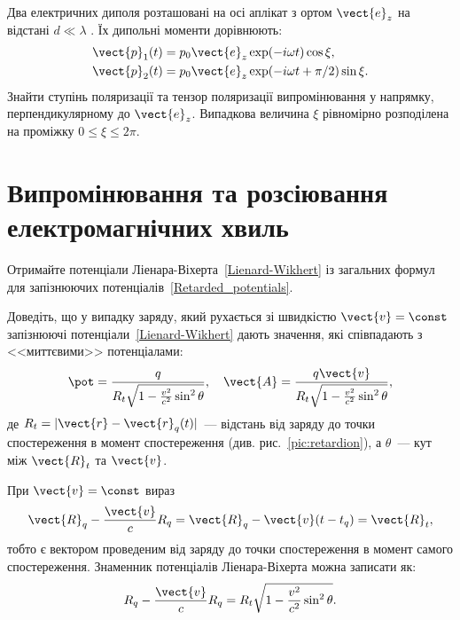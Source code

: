 \begin{problem}
Два електричних диполя розташовані на осі аплікат з ортом $\vect{e}_z$  на відстані $d \ll \lambda$ . Їх дипольні моменти дорівнюють:
\begin{align*}
	\vect{p}_1(t) & = p_0\vect{e}_z\exp(-i\omega t)\cos\xi,        \\
	\vect{p}_2(t) & = p_0\vect{e}_z\exp(-i\omega t +\pi/2)\sin\xi.
\end{align*}
Знайти ступінь поляризації та тензор поляризації випромінювання у напрямку, перпендикулярному до $\vect{e}_z$. Випадкова величина $\xi$ рівномірно розподілена на проміжку $0 \le \xi \le 2\pi$.
\end{problem}



\section{Випромінювання та розсіювання електромагнічних хвиль}


\begin{problem}
Отримайте потенціали Ліенара-Віхерта~\eqref{Lienard-Wikhert} із загальних формул для запізнюючих потенціалів~\eqref{Retarded_potentials}.
\end{problem}


\begin{problem}
Доведіть, що у випадку заряду, який рухається зі швидкістю $\vect{v} = \const$ запізнюючі потенціали~\eqref{Lienard-Wikhert} дають значення, які співпадають з <<миттєвими>> потенціалами:
\[
	\pot =  \frac{q}{R_t\sqrt{1-\frac{v^2}{c^2}\sin^2\theta}}, \quad
	\vect{A} =\frac{q\vect{v}}{R_t\sqrt{1-\frac{v^2}{c^2}\sin^2\theta}},
\]
де $R_t = |\vect{r} - \vect{r}_q(t)|$~--- відстань від заряду до точки спостереження в момент спостереження (див. рис.~\ref{pic:retardion}), а $\theta$~--- кут між $\vect{R}_t$ та $\vect{v}$.
\begin{solution}
	При $\vect{v} = \const$  вираз
	\[
		\vect{R}_q - \frac{\vect{v}}{c} R_q = \vect{R}_q -\vect{v}(t - t_q) = \vect{R}_t,
	\]
	тобто є вектором проведеним від заряду до точки спостереження в момент самого спостереження.
	Знаменник потенціалів Ліенара-Віхерта можна записати як:
	\[
		R_q - \frac{\vect{v}}{c} R_q = R_t\sqrt{1-\frac{v^2}{c^2}\sin^2\theta}.
	\]
\end{solution}
\end{problem}


